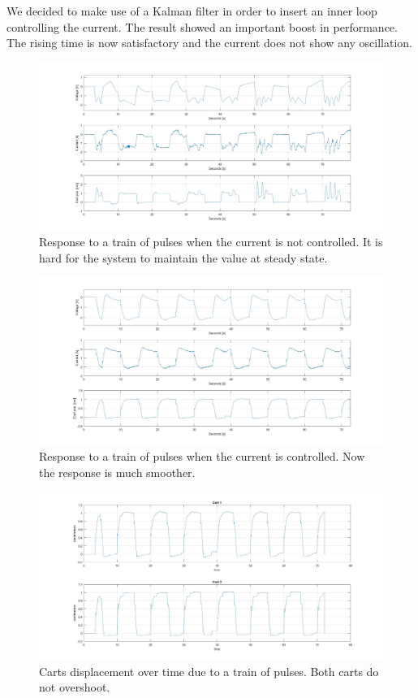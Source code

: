 We decided to make use of a Kalman filter in order to insert an inner loop controlling the current. The result showed an important boost in performance. The rising time is now satisfactory and the current does not show any oscillation.\\

\begin{figure}[h]
	\setlength{\abovecaptionskip}{-10pt}
	\setlength{\belowcaptionskip}{-10pt}
	\centering
	\includegraphics[width=0.9\linewidth]{img/hinf_nocurr}
	\caption{Response to a train of pulses when the current is not controlled. It is hard for the system to maintain the value at steady state.}
	\label{fig:hinfnocurr}
\end{figure}

\begin{figure}[h]
	\setlength{\abovecaptionskip}{-10pt}
	\setlength{\belowcaptionskip}{-10pt}	
	\centering
	\includegraphics[width=0.9\linewidth]{img/hinf_curr}
	\caption{Response to a train of pulses when the current is controlled. Now the response is much smoother.}
	\label{fig:hinfnocurr}
\end{figure}

\begin{figure}[h]
	\setlength{\abovecaptionskip}{-10pt}
	\setlength{\belowcaptionskip}{-10pt}
	\centering
	\includegraphics[width=0.9\linewidth]{img/hinf_response}
	\caption{Carts displacement over time due to a train of pulses. Both carts do not overshoot.}
	\label{fig:2dofcarts}
\end{figure}